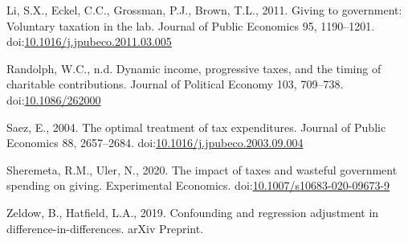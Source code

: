 \documentclass[ review  , 3p ]{elsarticle}
\begin{document}
  \leavevmode\hypertarget{ref-Li2011}{}%
  Li, S.X., Eckel, C.C., Grossman, P.J., Brown, T.L., 2011. Giving to government: Voluntary taxation in the lab. Journal of Public Economics 95, 1190--1201. doi:\href{https://doi.org/10.1016/j.jpubeco.2011.03.005}{10.1016/j.jpubeco.2011.03.005}
  
  \leavevmode\hypertarget{ref-Randolph1995}{}%
  Randolph, W.C., n.d. Dynamic income, progressive taxes, and the timing of charitable contributions. Journal of Political Economy 103, 709--738. doi:\href{https://doi.org/10.1086/262000}{10.1086/262000}
  
  \leavevmode\hypertarget{ref-Saez2004}{}%
  Saez, E., 2004. The optimal treatment of tax expenditures. Journal of Public Economics 88, 2657--2684. doi:\href{https://doi.org/10.1016/j.jpubeco.2003.09.004}{10.1016/j.jpubeco.2003.09.004}
  
  \leavevmode\hypertarget{ref-Sheremeta2020}{}%
  Sheremeta, R.M., Uler, N., 2020. The impact of taxes and wasteful government spending on giving. Experimental Economics. doi:\href{https://doi.org/10.1007/s10683-020-09673-9}{10.1007/s10683-020-09673-9}
  
  \leavevmode\hypertarget{ref-Zeldow2019}{}%
  Zeldow, B., Hatfield, L.A., 2019. Confounding and regression adjustment in difference-in-differences. arXiv Preprint.
\end{document}
